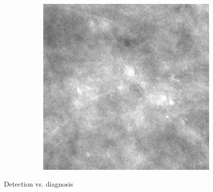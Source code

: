 \documentclass{beamer}
\begin{document}
\begin{frame}
\begin{figure}[h]
\begin{subfigure}{0.35\textwidth}
				\includegraphics[width=\textwidth]{plots/breastMicrocalcification.jpg}
			\end{subfigure}
		\end{figure}

		Detection vs. diagnosis
	\end{frame}
		
\end{document}

